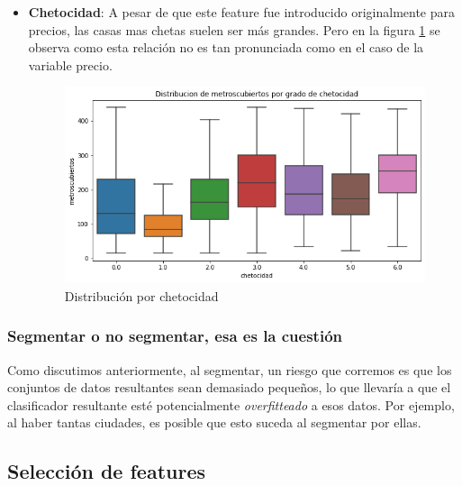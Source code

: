 \begin{itemize}
        \item \textbf{Chetocidad}: A pesar de que este feature fue introducido originalmente para precios, las casas mas chetas suelen ser más grandes. Pero en la figura \ref{fig:m2-dist-chet} se observa como esta relación no es tan pronunciada como en el caso de la variable precio.
        
        \begin{figure}[H]
            \centering
            \includegraphics[scale=0.45]{img/cmp/metroscubiertos/dist-chetocidad.png}
            \caption{Distribución por chetocidad}
            \label{fig:m2-dist-chet}
        \end{figure}
    \end{itemize}
    
    \subsubsection{Segmentar o no segmentar, esa es la cuestión}
    
    Como discutimos anteriormente, al segmentar, un riesgo que corremos es que los conjuntos de datos resultantes sean demasiado pequeños, lo que llevaría a que el clasificador resultante esté potencialmente \textit{overfitteado} a esos datos. Por ejemplo, al haber tantas ciudades, es posible que esto suceda al segmentar por ellas.

    \subsection{Selección de features}
    
